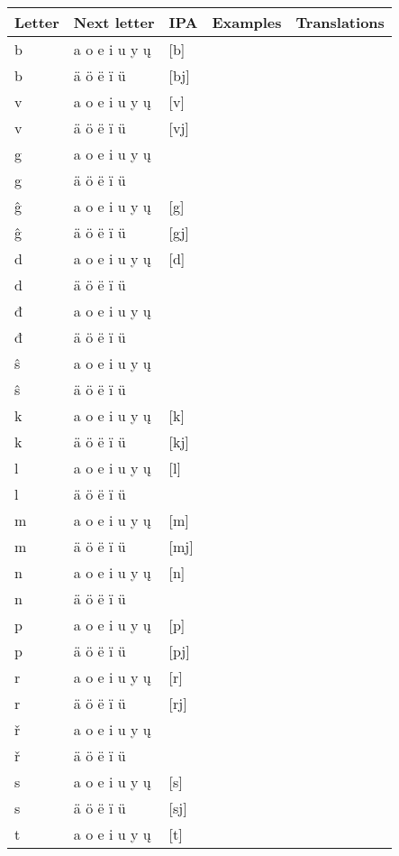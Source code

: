 \begin{longtable}{lllll}
		Letter & Next letter & IPA & Examples & Translations \\
		\endhead
		b & a o e i u y ų  & [b] && \\
		b & ä ö ë ï ü & [bj] && \\
		v & a o e i u y ų & [v] && \\
		v & ä ö ë ï ü & [vj] && \\
		g & a o e i u y ų & \textipa{[H]} && \\
		g & ä ö ë ï ü & \textipa{[Hj]} && \\
		ĝ & a o e i u y ų  & [g] && \\
		ĝ & ä ö ë ï ü & [gj] && \\
		d & a o e i u y ų & [d] && \\
		d & ä ö ë ï ü & \textipa{[\textbardotlessj]} && \\	
		đ & a o e i u y ų & \textipa{[\t{\:d\:z}]} & & \\
		đ & ä ö ë ï ü & \textipa{[\t{dZ}]} && \\
		ŝ & a o e i u y ų  & \textipa{[\t{dz}]} && \\
		ŝ & ä ö ë ï ü & \textipa{[\t{dzj}]} && \\
		k & a o e i u y ų & [k] && \\  
		k & ä ö ë ï ü  & [kj] && \\ 
		l & a o e i u y ų  & [l] && \\  
		l & ä ö ë ï ü  & \textipa{[L]} && \\ 
		m & a o e i u y ų  & [m] && \\  
		m & ä ö ë ï ü  & [mj] && \\
		n & a o e i u y ų  & [n] && \\  
		n & ä ö ë ï ü  & \textipa{[\textltailn]} && \\
		p & a o e i u y ų & [p] && \\  
		p & ä ö ë ï ü  & [pj] && \\ 
		r & a o e i u y ų  & [r] && \\  
		r & ä ö ë ï ü  & [rj] && \\
		ř & a o e i u y ų  & \textipa{[\r*r]} && \\  
		ř & ä ö ë ï ü  & \textipa{[\r*rj]} && \\ 
		s & a o e i u y ų & [s] && \\  
		s & ä ö ë ï ü  & [sj] && \\ 
		t & a o e i u y ų  & [t] && \\ 

\end{longtable}
